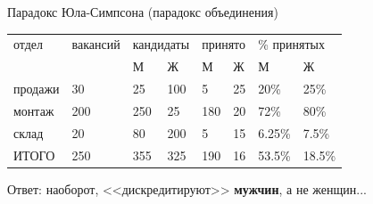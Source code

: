 \begin{frame}[fragile,t]{Парадокс Юла-Симпсона (парадокс объединения)}

\begin{table}[] %
	\footnotesize
	\begin{tabular}{|l|l|ll|ll|ll|}
		\hline
		отдел & вакансий & \multicolumn{2}{l|}{кандидаты} & \multicolumn{2}{l|}{принято } & \multicolumn{2}{l|}{\% принятых} \\ \cline{3-8} 
		&                                      & \multicolumn{1}{l|}{М}   & Ж   & \multicolumn{1}{l|}{М}        & Ж      & \multicolumn{1}{l|}{М}         & Ж         \\ \hline
		продажи                & 30                                   & \multicolumn{1}{l|}{25}  & 100 & \multicolumn{1}{l|}{5}        & 25     & \multicolumn{1}{l|}{20\%}      & 25\%      \\ \hline
		монтаж                 & 200                                  & \multicolumn{1}{l|}{250} & 25  & \multicolumn{1}{l|}{180}      & 20     & \multicolumn{1}{l|}{72\%}      & 80\%      \\ \hline
		склад                  & 20                                   & \multicolumn{1}{l|}{80}  & 200 & \multicolumn{1}{l|}{5}        & 15     & \multicolumn{1}{l|}{6.25\%}    & 7.5\%     \\ \hline
		ИТОГО                  & 250                                  & \multicolumn{1}{l|}{355} & 325 & \multicolumn{1}{l|}{190}      & 16     & \multicolumn{1}{l|}{53.5\%}    & 18.5\%    \\ \hline
	\end{tabular}
\end{table}


Ответ: наоборот, <<дискредитируют>> \textbf{мужчин}, а не женщин...
\end{frame}

%	
%	


